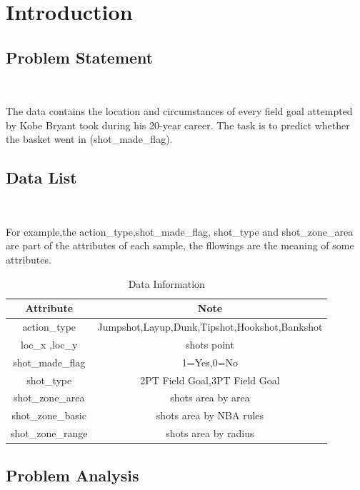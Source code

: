 
\section{Introduction}\label{sec-intro}

\subsection{Problem Statement}
\

The data contains the location and circumstances of every field goal 
attempted by Kobe Bryant took during his 20-year career. The task is to predict 
whether the basket went in (shot_made_flag).




\subsection{Data List}
\

For example,the action_type,shot_made_flag,  
shot_type and shot_zone_area are part of the attributes of each sample,
the fllowings are the meaning of some attributes.

\begin{table}[htbp]
	\centering
	\begin{tabular}{cc}
		\toprule  %
		Attribute& Note\\
		\hline
		action_type & Jumpshot,Layup,Dunk,Tipshot,Hookshot,Bankshot\\
		loc_x ,loc_y & shots point\\
		shot_made_flag & 1=Yes,0=No\\
		shot_type & 2PT Field Goal,3PT Field Goal\\
		shot_zone_area & shots area by area\\
		shot_zone_basic & shots area by  NBA rules\\
		shot_zone_range & shots area by radius\\
		
		\bottomrule %
	\end{tabular}
	\bigskip
	\caption{Data Information}
\end{table}
\label{table1}



\subsection{Problem Analysis}

